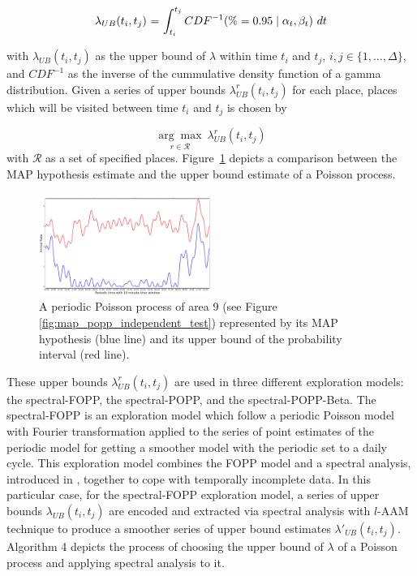 \begin{equation}
	\label{eq:upper_bound_exploration}
	\begin{tabular}{r@{ = }l}
	$\lambda_{UB}(t_i, t_j)$ & $\displaystyle \int_{t_i}^{t_j} CDF^{-1}(\% = 0.95 \mid \alpha_t, \beta_t)~dt$\\ [1ex]
	\end{tabular}
\end{equation}

\noindent with $\lambda_{UB}(t_i, t_j)$ as the upper bound of $\lambda$ within time $t_i$ and $t_j$, $i, j \in \{1, \ldots, \Delta\}$, and $CDF^{-1}$ as the inverse of the cummulative density function of a gamma distribution. Given a series of upper bounds $\lambda^{r}_{UB}(t_i, t_j)$ for each place, places which will be visited between time $t_i$ and $t_j$ is chosen by

\begin{equation}
\label{eq:choosing_place}
\underset{r \in \mathcal R}{\arg\max}~\lambda^{r}_{UB}(t_i, t_j)
\end{equation}
\noindent with $\mathcal R$ as a set of specified places. Figure~\ref{fig:map_vs_ub} depicts a comparison between the MAP hypothesis estimate and the upper bound estimate of a Poisson process.

\begin{figure}[t!]
	\centering
	\includegraphics[width=0.5\textwidth]{./figures/map_vs_ub.png}
	\caption{A periodic Poisson process of area 9 (see Figure \ref{fig:map_popp_independent_test}) represented by its MAP hypothesis (blue line) and its upper bound of the probability interval (red line).}
	\label{fig:map_vs_ub}
\end{figure}

These upper bounds $\lambda^{r}_{UB}(t_i, t_j)$ are used in three different exploration models: the spectral-FOPP, the spectral-POPP, and the spectral-POPP-Beta. The spectral-FOPP is an exploration model which follow a periodic Poisson model with Fourier transformation applied to the series of point estimates of the periodic model for getting a smoother model with the periodic set to a daily cycle. This exploration model combines the FOPP model and a spectral analysis, introduced in \cite{jovan_iros16}, together to cope with temporally incomplete data. In this particular case, for the spectral-FOPP exploration model, a series of upper bounds $\lambda_{UB}(t_i, t_j)$ are encoded and extracted via spectral analysis with $l$-AAM technique \cite{jovan_iros16} to produce a smoother series of upper bound estimates $\lambda'_{UB}(t_i, t_j)$. Algorithm 4 depicts the process of choosing the upper bound of $\lambda$ of a Poisson process and applying spectral analysis to it.


